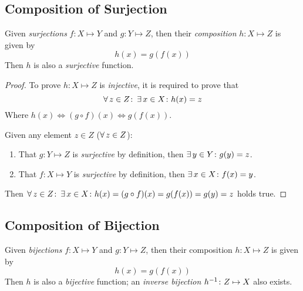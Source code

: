 \subsection{Composition of Surjection}
\begin{proposition}
    Given \textit{surjections} $f \colon X \mapsto Y$ and $g \colon Y \mapsto Z$, then their \textit{composition} $h \colon X \mapsto Z$ is given by
    \begin{equation}
        h(x) = g(f(x))
    \end{equation}
    Then $h$ is also a \textit{surjective} function.
\end{proposition}

\begin{proof}
    To prove $h \colon X \mapsto Z$ is \textit{injective}, it is required to prove that
    \begin{equation}
        \operatorname{\forall} z \in Z \colon \operatorname{\exists} x \in X \colon h(x) = z
    \end{equation}
    Where $h(x) \Leftrightarrow (g \circ f)(x) \Leftrightarrow g(f(x))$.
    
    Given any element $z \in Z$ ($\operatorname{\forall} z \in Z$):
    \begin{enumerate}
        \item That $g \colon Y \mapsto Z$ is \textit{surjective} by definition, then $\operatorname{\exists} y \in Y \colon g(y) = z$.
        \item That $f \colon X \mapsto Y$ is \textit{surjective} by definition, then $\operatorname{\exists} x \in X \colon f(x) = y$.
    \end{enumerate}
    Then $\operatorname{\forall} z \in Z \colon \operatorname{\exists} x \in X \colon h(x) = (g \circ f)(x) = g(f(x)) = g(y) = z$ holds true.
\end{proof}

\subsection{Composition of Bijection}
\begin{proposition}
    Given \textit{bijections} $f \colon X \mapsto Y$ and $g \colon Y \mapsto Z$, then their composition $h \colon X \mapsto Z$ is given by
    \begin{equation}
        h(x) = g(f(x))
    \end{equation}
    Then $h$ is also a \textit{bijective} function; an \textit{inverse bijection} ${h}^{-1} \colon Z \mapsto X$ also exists.
\end{proposition}

